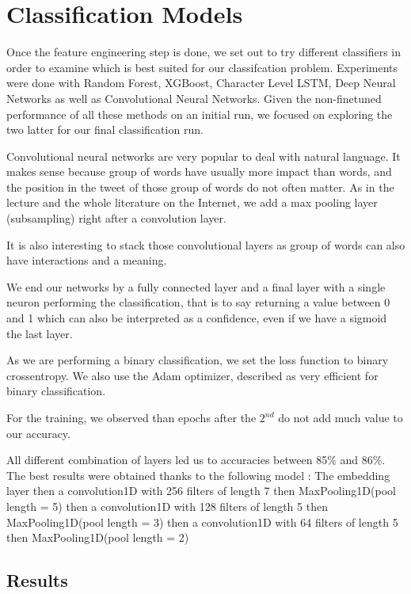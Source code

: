\documentclass[10pt,conference,compsocconf,retainorgcmds]{IEEEtran}
\begin{document}
\section{Classification Models}
Once the feature engineering step is done, we set out to try different classifiers in order to examine which is best suited for our classifcation problem. Experiments were done with Random Forest, XGBoost, Character Level  LSTM, Deep Neural Networks as well as Convolutional Neural Networks. Given the non-finetuned performance of all these methods on an initial run, we focused on exploring the two latter for our final classification run.

Convolutional neural networks are very popular to deal with natural language. It makes sense because group of words have usually more impact than words, and the position in the tweet of those group of words do not often matter.
As in the lecture and the whole literature on the Internet, we add a max pooling layer (subsampling) right after a convolution layer.

It is also interesting to stack those convolutional layers as group of words can also have interactions and a meaning.

We end our networks by a fully connected layer and a final layer with a single neuron performing the classification, that is to say returning a value between 0 and 1 which can also be interpreted as a confidence, even if we have a sigmoid the last layer.

As we are performing a binary classification, we set the loss function to binary crossentropy. We also use the Adam optimizer, described as very efficient for binary classification.

For the training, we observed than epochs after the $2^{nd}$ do not add much value to our accuracy.



All different combination of layers led us to accuracies between 85\% and 86\%.
The best results were obtained thanks to the following model : The embedding layer then a convolution1D with 256 filters of length 7 then MaxPooling1D(pool length = 5) then a convolution1D with 128 filters of length 5 then MaxPooling1D(pool length = 3) then a convolution1D with 64 filters of length 5 then MaxPooling1D(pool length = 2) 


\subsection{Results}
\end{document}
